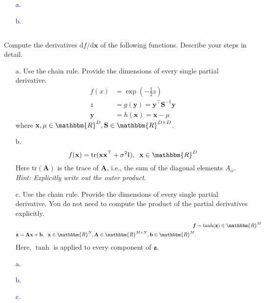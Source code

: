 \documentclass[a4paper,12pt]{article}
\newcommand{\R}{\mathbbm{R}}
\newcommand{\vecx}{\textbf{x}}
\newcommand{\vecy}{\textbf{y}}
\newcommand{\vecz}{\textbf{z}}
\newcommand{\vecb}{\textbf{b}}
\newcommand{\matA}{\textbf{A}}
\newcommand{\inv}{^{-1}}
\begin{document}
\textcolor{blue}{
\begin{itemize}
 \item [a.] 
 \item [b.] 
\end{itemize}
}
\subsection{}
Compute the derivatives $\textrm{d}f/\textrm{d}\vecx$ of the following functions. Describe your steps in detail.
\begin{itemize}
 \item [a.] Use the chain rule. Provide the dimensions of every single partial derivative.
 \begin{align*}
 f(x) &= \exp(-\frac{1}{2}z) \\
 z &= g(\vecy) = \vecy^\top \textbf{S}\inv \vecy \\
 \vecy &= h(\vecx) = \vecx - \mu
 \end{align*}
 where $\vecx, \mu \in \R^D, \textbf{S} \in \R^{D \times D}$.
 \item [b.] $$f(\vecx) = \textrm{tr}(\vecx \vecx^\top + \sigma^2 \textrm{I}), \;\; \vecx \in \R^D$$
 Here tr$(\matA)$ is the trace of $\matA$, i.e., the sum of the diagonal elements $A_{ii}$. \\
 \textit{Hint: Explicitly write out the outer product.}
 \item [c.] Use the chain rule. Provide the dimensions of every single partial derivative. You do not need to compute the product of the partial derivatives explicitly.
 \begin{align*}
 \textbf{\textit{f}} &= \tanh(\vecz) \in \R^M \\
 \vecz = \matA \vecx + \vecb, \;\; \vecx \in \R^N, \matA \in \R^{M \times N}, \vecb \in \R^M.
 \end{align*}
 Here, $\tanh$ is applied to every component of $\vecz$.
\end{itemize}
\textcolor{blue}{
\begin{itemize}
 \item [a.] 
 \item [b.] 
 \item [c.]
\end{itemize}
}
\end{document}
